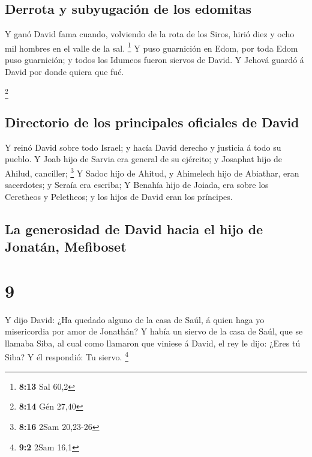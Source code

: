 \hypertarget{derrota-y-subyugaciuxf3n-de-los-edomitas}{%
\subsection{Derrota y subyugación de los
edomitas}\label{derrota-y-subyugaciuxf3n-de-los-edomitas}}

 Y ganó David fama cuando, volviendo de la rota de los
Siros, hirió diez y ocho mil hombres en el valle de la sal. \footnote{\textbf{8:13}
  Sal 60,2}  Y puso guarnición en Edom, por toda Edom puso
guarnición; y todos los Idumeos fueron siervos de David. Y Jehová guardó
á David por donde quiera que fué.

\footnote{\textbf{8:14} Gén 27,40}

\hypertarget{directorio-de-los-principales-oficiales-de-david}{%
\subsection{Directorio de los principales oficiales de
David}\label{directorio-de-los-principales-oficiales-de-david}}

 Y reinó David sobre todo Israel; y hacía David derecho y
justicia á todo su pueblo.  Y Joab hijo de Sarvia era
general de su ejército; y Josaphat hijo de Ahilud, canciller;
\footnote{\textbf{8:16} 2Sam 20,23-26}  Y Sadoc hijo de
Ahitud, y Ahimelech hijo de Abiathar, eran sacerdotes; y Seraía era
escriba;  Y Benahía hijo de Joiada, era sobre los Ceretheos
y Peletheos; y los hijos de David eran los príncipes.

\hypertarget{la-generosidad-de-david-hacia-el-hijo-de-jonatuxe1n-mefiboset}{%
\subsection{La generosidad de David hacia el hijo de Jonatán,
Mefiboset}\label{la-generosidad-de-david-hacia-el-hijo-de-jonatuxe1n-mefiboset}}

\hypertarget{section-8}{%
\section{9}\label{section-8}}

 Y dijo David: ¿Ha quedado alguno de la casa de Saúl, á
quien haga yo misericordia por amor de Jonathán?  Y había un
siervo de la casa de Saúl, que se llamaba Siba, al cual como llamaron
que viniese á David, el rey le dijo: ¿Eres tú Siba? Y él respondió: Tu
siervo. \footnote{\textbf{9:2} 2Sam 16,1}

